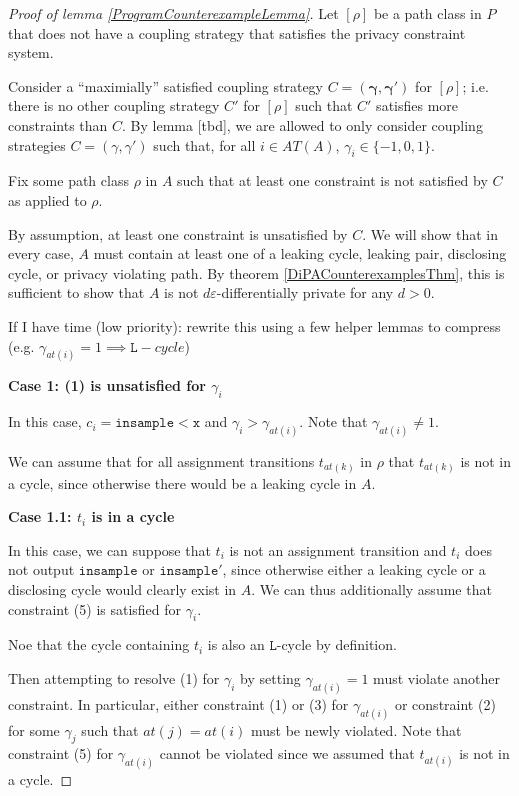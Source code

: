 \documentclass[12pt]{article}
\newcommand{\lguard}[1][x]{\texttt{insample} < #1}
\newcommand{\lcycle}{\texttt{L}-cycle}
\theoremstyle{definition}
\begin{document}
\begin{proof}[Proof of lemma \ref{ProgramCounterexampleLemma}]
    Let $[\rho]$ be a path class in $P$ that does not have a coupling strategy that satisfies the privacy constraint system.

    Consider a ``maximially'' satisfied coupling strategy $C=(\mathbf{\gamma}, \mathbf{\gamma}')$ for $[\rho]$; i.e. there is no other coupling strategy $C'$ for $[\rho]$ such that $C'$ satisfies more constraints than $C$. By lemma [tbd], we are allowed to only consider coupling strategies $C=(\gamma, \gamma')$ such that, for all $i\in AT(A)$, $\gamma_i \in \{-1, 0, 1\}$. 

    Fix some path class $\rho$ in $A$ such that at least one constraint is not satisfied by $C$ as applied to $\rho$.

    By assumption, at least one constraint is unsatisfied by $C$. We will show that in every case, $A$ must contain at least one of a leaking cycle, leaking pair, disclosing cycle, or privacy violating path. By theorem \ref{DiPACounterexamplesThm}, this is sufficient to show that $A$ is not $d\varepsilon$-differentially private for any $d>0$.

    {\color{red} If I have time (low priority): rewrite this using a few helper lemmas to compress (e.g. $\gamma_{at(i)} =1\implies \lcycle$)}

    \textbf{Case 1: (1) is unsatisfied for $\gamma_i$}
    
    In this case, $c_i = \lguard[\texttt{x}]$ and $\gamma_i > \gamma_{at(i)}$. Note that $\gamma_{at(i)} \neq 1$. 

    We can assume that for all assignment transitions $t_{at(k)}$ in $\rho$ that $t_{at(k)}$ is not in a cycle, since otherwise there would be a leaking cycle in $A$. 

    \textbf{Case 1.1: $t_i$ is in a cycle}

    In this case, we can suppose that $t_i$ is not an assignment transition and $t_i$ does not output $\texttt{insample}$ or $\texttt{insample}'$, since otherwise either a leaking cycle or a disclosing cycle would clearly exist in $A$. We can thus additionally assume that constraint (5) is satisfied for $\gamma_i$. 
    
    Noe that the cycle containing $t_i$ is also an $\texttt{L}$-cycle by definition.

    Then attempting to resolve (1) for $\gamma_i$ by setting $\gamma_{at(i)} = 1$ must violate another constraint. In particular, either constraint (1) or (3) for $\gamma_{at(i)}$ or constraint (2) for some $\gamma_j$ such that $at(j) = at(i)$ must be newly violated. Note that constraint (5) for $\gamma_{at(i)}$ cannot be violated since we assumed that $t_{at(i)}$ is not in a cycle. 


\end{proof}
\end{document}
